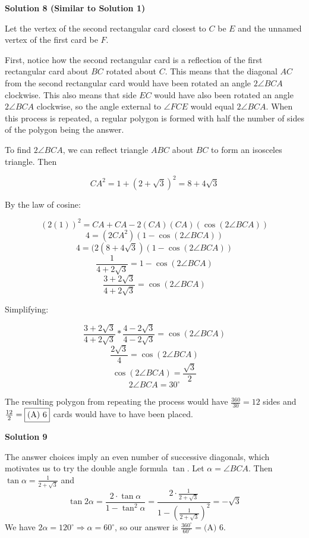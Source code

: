 \begin{enumerate}
\textbf{Solution 8 (Similar to Solution 1)}

Let the vertex of the second rectangular card closest to $C$ be $E$ and the unnamed vertex of the first card be $F$. 

 First, notice how the second rectangular card is a reflection of the first rectangular card about $BC$ rotated about $C$. This means that the diagonal $AC$ from the second rectangular card would have been rotated an angle $2\angle BCA$ clockwise. This also means that side $EC$ would have also been rotated an angle $2\angle BCA$ clockwise, so the angle external to $\angle FCE$ would equal $2\angle BCA$. When this process is repeated, a regular polygon is formed with half the number of sides of the polygon being the answer.

 To find $2\angle BCA$, we can reflect triangle $ABC$ about $BC$ to form an isosceles triangle. Then

 
 \[CA^2=1+(2+\sqrt{3})^2=8+4\sqrt{3}\]

 By the law of cosine:

 
 \[(2(1))^2=CA+CA-2(CA)(CA)(\cos (2\angle BCA))\]
 \[4=(2CA^2)(1-\cos (2\angle BCA))\]
 \[4=(2(8+4\sqrt{3})(1-\cos (2\angle BCA))\]
 \[\frac{1}{4+2\sqrt{3}}=1-\cos (2\angle BCA)\]
 \[\frac{3+2\sqrt{3}}{4+2\sqrt{3}}=\cos (2\angle BCA)\]

 Simplifying: 

 
 \[\frac{3+2\sqrt{3}}{4+2\sqrt{3}}*\frac{4-2\sqrt{3}}{4-2\sqrt{3}}=\cos (2\angle BCA)\]
 \[\frac{2\sqrt{3}}{4}=\cos (2\angle BCA)\]
 \[\cos (2\angle BCA)=\frac{\sqrt{3}}{2}\]
 \[2\angle BCA = 30^\circ\]

 The resulting polygon from repeating the process would have $\frac{360}{30}=12$ sides and $\frac{12}{2}=\fbox{(A) 6}$ cards would have to have been placed.

 


 



\textbf{Solution 9}

The answer choices imply an even number of successive diagonals, which motivates us to try the double angle formula $\tan$. Let $\alpha = \angle{BCA}$. Then $\tan{\alpha} = \frac{1}{2 + \sqrt{3}}$ and
 \[\tan{2\alpha} = \frac{2\cdot \tan{\alpha}}{1 - \tan^2{\alpha}}                = \frac{2 \cdot \frac{1}{2 + \sqrt{3}}}{1 - (\frac{1}{2 + \sqrt{3}})^2}                = -\sqrt{3}\]We have $2\alpha = 120^{\circ} \Rightarrow \alpha = 60^{\circ}$, so our answer is $\frac{360^\circ}{60^\circ} = \boxed{\text{(A) }6}$.


\end{enumerate}
